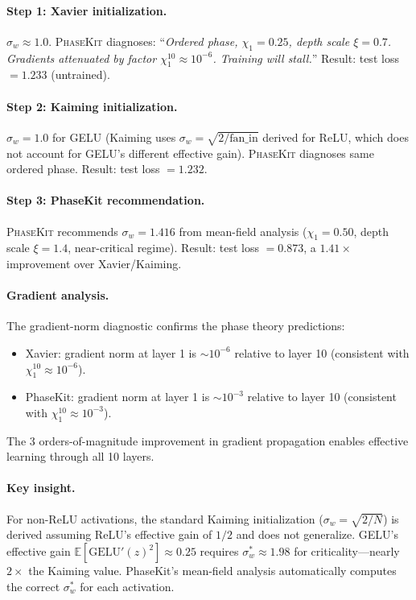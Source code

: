 \documentclass[10pt]{article}
\newcommand{\EE}{\mathbb{E}}
\newcommand{\ToolName}{\textsc{PhaseKit}}
\begin{document}
\paragraph{Step 1: Xavier initialization.} $\sigma_w \approx 1.0$. \ToolName{} diagnoses: ``\emph{Ordered phase, $\chi_1 = 0.25$, depth scale $\xi = 0.7$. Gradients attenuated by factor $\chi_1^{10} \approx 10^{-6}$. Training will stall.}'' Result: test loss $= 1.233$ (untrained).

\paragraph{Step 2: Kaiming initialization.} $\sigma_w = 1.0$ for GELU (Kaiming uses $\sigma_w = \sqrt{2/\text{fan\_in}}$ derived for ReLU, which does not account for GELU's different effective gain). \ToolName{} diagnoses same ordered phase. Result: test loss $= 1.232$.

\paragraph{Step 3: PhaseKit recommendation.} \ToolName{} recommends $\sigma_w = 1.416$ from mean-field analysis ($\chi_1 = 0.50$, depth scale $\xi = 1.4$, near-critical regime). Result: test loss $= 0.873$, a $\mathbf{1.41\times}$ improvement over Xavier/Kaiming.

\paragraph{Gradient analysis.}
The gradient-norm diagnostic confirms the phase theory predictions:
\begin{itemize}[nosep]
    \item Xavier: gradient norm at layer 1 is $\sim 10^{-6}$ relative to layer 10 (consistent with $\chi_1^{10} \approx 10^{-6}$).
    \item PhaseKit: gradient norm at layer 1 is $\sim 10^{-3}$ relative to layer 10 (consistent with $\chi_1^{10} \approx 10^{-3}$).
\end{itemize}
The 3 orders-of-magnitude improvement in gradient propagation enables effective learning through all 10 layers.

\paragraph{Key insight.}
For non-ReLU activations, the standard Kaiming initialization ($\sigma_w = \sqrt{2/N}$) is derived assuming ReLU's effective gain of $1/2$ and does not generalize.
GELU's effective gain $\EE[\text{GELU}'(z)^2] \approx 0.25$ requires $\sigma_w^* \approx 1.98$ for criticality---nearly $2\times$ the Kaiming value.
PhaseKit's mean-field analysis automatically computes the correct $\sigma_w^*$ for each activation.
\end{document}
